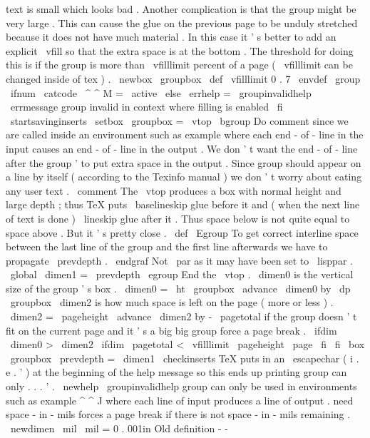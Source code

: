 text
is
small
which
looks
bad
.
%
%
Another
complication
is
that
the
group
might
be
very
large
.
This
can
%
cause
the
glue
on
the
previous
page
to
be
unduly
stretched
because
it
%
does
not
have
much
material
.
In
this
case
it
'
s
better
to
add
an
%
explicit
\
vfill
so
that
the
extra
space
is
at
the
bottom
.
The
%
threshold
for
doing
this
is
if
the
group
is
more
than
\
vfilllimit
%
percent
of
a
page
(
\
vfilllimit
can
be
changed
inside
of
tex
)
.
%
\
newbox
\
groupbox
\
def
\
vfilllimit
{
0
.
7
}
%
\
envdef
\
group
{
%
\
ifnum
\
catcode
\
^
^
M
=
\
active
\
else
\
errhelp
=
\
groupinvalidhelp
\
errmessage
{
group
invalid
in
context
where
filling
is
enabled
}
%
\
fi
\
startsavinginserts
%
\
setbox
\
groupbox
=
\
vtop
\
bgroup
%
Do
comment
since
we
are
called
inside
an
environment
such
as
%
example
where
each
end
-
of
-
line
in
the
input
causes
an
%
end
-
of
-
line
in
the
output
.
We
don
'
t
want
the
end
-
of
-
line
after
%
the
group
'
to
put
extra
space
in
the
output
.
Since
group
%
should
appear
on
a
line
by
itself
(
according
to
the
Texinfo
%
manual
)
we
don
'
t
worry
about
eating
any
user
text
.
\
comment
}
%
%
The
\
vtop
produces
a
box
with
normal
height
and
large
depth
;
thus
TeX
puts
%
\
baselineskip
glue
before
it
and
(
when
the
next
line
of
text
is
done
)
%
\
lineskip
glue
after
it
.
Thus
space
below
is
not
quite
equal
to
space
%
above
.
But
it
'
s
pretty
close
.
\
def
\
Egroup
{
%
%
To
get
correct
interline
space
between
the
last
line
of
the
group
%
and
the
first
line
afterwards
we
have
to
propagate
\
prevdepth
.
\
endgraf
%
Not
\
par
as
it
may
have
been
set
to
\
lisppar
.
\
global
\
dimen1
=
\
prevdepth
\
egroup
%
End
the
\
vtop
.
%
\
dimen0
is
the
vertical
size
of
the
group
'
s
box
.
\
dimen0
=
\
ht
\
groupbox
\
advance
\
dimen0
by
\
dp
\
groupbox
%
\
dimen2
is
how
much
space
is
left
on
the
page
(
more
or
less
)
.
\
dimen2
=
\
pageheight
\
advance
\
dimen2
by
-
\
pagetotal
%
if
the
group
doesn
'
t
fit
on
the
current
page
and
it
'
s
a
big
big
%
group
force
a
page
break
.
\
ifdim
\
dimen0
>
\
dimen2
\
ifdim
\
pagetotal
<
\
vfilllimit
\
pageheight
\
page
\
fi
\
fi
\
box
\
groupbox
\
prevdepth
=
\
dimen1
\
checkinserts
}
%
%
TeX
puts
in
an
\
escapechar
(
i
.
e
.
'
)
at
the
beginning
of
the
help
%
message
so
this
ends
up
printing
group
can
only
.
.
.
'
.
%
\
newhelp
\
groupinvalidhelp
{
%
group
can
only
be
used
in
environments
such
as
example
^
^
J
%
where
each
line
of
input
produces
a
line
of
output
.
}
%
need
space
-
in
-
mils
%
forces
a
page
break
if
there
is
not
space
-
in
-
mils
remaining
.
\
newdimen
\
mil
\
mil
=
0
.
001in
%
Old
definition
-
-
